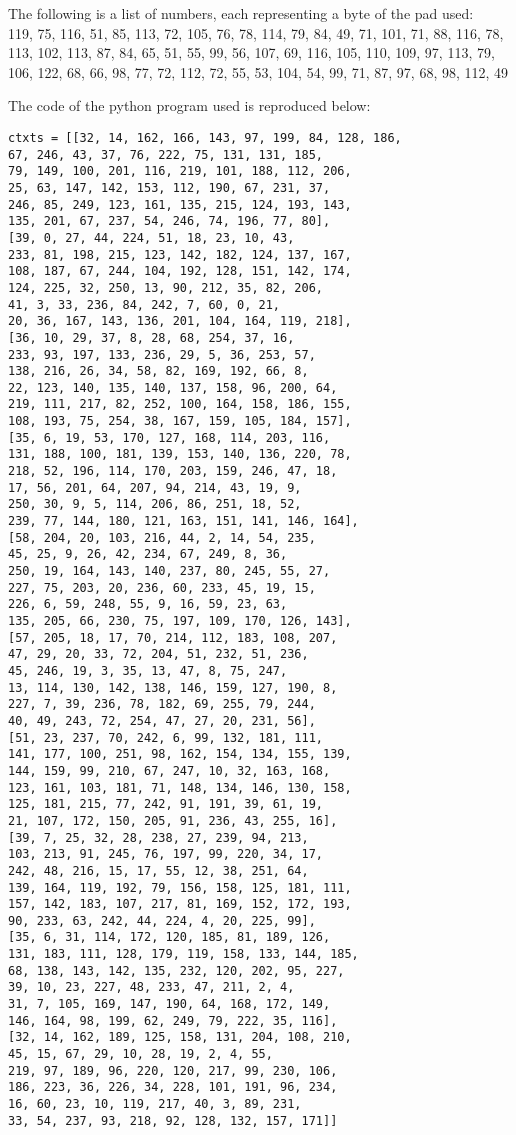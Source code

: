 \documentclass[11pt]{article}
\begin{document}
The following is a list of numbers, each representing a byte of the pad used:\\
119, 75, 116, 51, 85, 113, 72, 105, 76, 78, 114, 79, 84, 49, 71, 101, 71, 88, 116, 78, 113, 102, 113, 87, 84, 65, 51, 55, 99, 56, 107, 69, 116, 105, 110, 109, 97, 113, 79, 106, 122, 68, 66, 98, 77, 72, 112, 72, 55, 53, 104, 54, 99, 71, 87, 97, 68, 98, 112, 49

The code of the python program used is reproduced below:
\begin{verbatim}
ctxts = [[32, 14, 162, 166, 143, 97, 199, 84, 128, 186, 
67, 246, 43, 37, 76, 222, 75, 131, 131, 185, 
79, 149, 100, 201, 116, 219, 101, 188, 112, 206, 
25, 63, 147, 142, 153, 112, 190, 67, 231, 37, 
246, 85, 249, 123, 161, 135, 215, 124, 193, 143, 
135, 201, 67, 237, 54, 246, 74, 196, 77, 80], 
[39, 0, 27, 44, 224, 51, 18, 23, 10, 43, 
233, 81, 198, 215, 123, 142, 182, 124, 137, 167, 
108, 187, 67, 244, 104, 192, 128, 151, 142, 174, 
124, 225, 32, 250, 13, 90, 212, 35, 82, 206, 
41, 3, 33, 236, 84, 242, 7, 60, 0, 21, 
20, 36, 167, 143, 136, 201, 104, 164, 119, 218], 
[36, 10, 29, 37, 8, 28, 68, 254, 37, 16, 
233, 93, 197, 133, 236, 29, 5, 36, 253, 57, 
138, 216, 26, 34, 58, 82, 169, 192, 66, 8, 
22, 123, 140, 135, 140, 137, 158, 96, 200, 64, 
219, 111, 217, 82, 252, 100, 164, 158, 186, 155, 
108, 193, 75, 254, 38, 167, 159, 105, 184, 157], 
[35, 6, 19, 53, 170, 127, 168, 114, 203, 116, 
131, 188, 100, 181, 139, 153, 140, 136, 220, 78, 
218, 52, 196, 114, 170, 203, 159, 246, 47, 18, 
17, 56, 201, 64, 207, 94, 214, 43, 19, 9, 
250, 30, 9, 5, 114, 206, 86, 251, 18, 52, 
239, 77, 144, 180, 121, 163, 151, 141, 146, 164], 
[58, 204, 20, 103, 216, 44, 2, 14, 54, 235, 
45, 25, 9, 26, 42, 234, 67, 249, 8, 36, 
250, 19, 164, 143, 140, 237, 80, 245, 55, 27, 
227, 75, 203, 20, 236, 60, 233, 45, 19, 15, 
226, 6, 59, 248, 55, 9, 16, 59, 23, 63, 
135, 205, 66, 230, 75, 197, 109, 170, 126, 143], 
[57, 205, 18, 17, 70, 214, 112, 183, 108, 207, 
47, 29, 20, 33, 72, 204, 51, 232, 51, 236, 
45, 246, 19, 3, 35, 13, 47, 8, 75, 247, 
13, 114, 130, 142, 138, 146, 159, 127, 190, 8, 
227, 7, 39, 236, 78, 182, 69, 255, 79, 244, 
40, 49, 243, 72, 254, 47, 27, 20, 231, 56], 
[51, 23, 237, 70, 242, 6, 99, 132, 181, 111, 
141, 177, 100, 251, 98, 162, 154, 134, 155, 139, 
144, 159, 99, 210, 67, 247, 10, 32, 163, 168, 
123, 161, 103, 181, 71, 148, 134, 146, 130, 158, 
125, 181, 215, 77, 242, 91, 191, 39, 61, 19, 
21, 107, 172, 150, 205, 91, 236, 43, 255, 16], 
[39, 7, 25, 32, 28, 238, 27, 239, 94, 213, 
103, 213, 91, 245, 76, 197, 99, 220, 34, 17, 
242, 48, 216, 15, 17, 55, 12, 38, 251, 64, 
139, 164, 119, 192, 79, 156, 158, 125, 181, 111, 
157, 142, 183, 107, 217, 81, 169, 152, 172, 193, 
90, 233, 63, 242, 44, 224, 4, 20, 225, 99], 
[35, 6, 31, 114, 172, 120, 185, 81, 189, 126, 
131, 183, 111, 128, 179, 119, 158, 133, 144, 185, 
68, 138, 143, 142, 135, 232, 120, 202, 95, 227, 
39, 10, 23, 227, 48, 233, 47, 211, 2, 4, 
31, 7, 105, 169, 147, 190, 64, 168, 172, 149, 
146, 164, 98, 199, 62, 249, 79, 222, 35, 116], 
[32, 14, 162, 189, 125, 158, 131, 204, 108, 210, 
45, 15, 67, 29, 10, 28, 19, 2, 4, 55, 
219, 97, 189, 96, 220, 120, 217, 99, 230, 106, 
186, 223, 36, 226, 34, 228, 101, 191, 96, 234, 
16, 60, 23, 10, 119, 217, 40, 3, 89, 231, 
33, 54, 237, 93, 218, 92, 128, 132, 157, 171]]


\end{verbatim}
\end{document}
